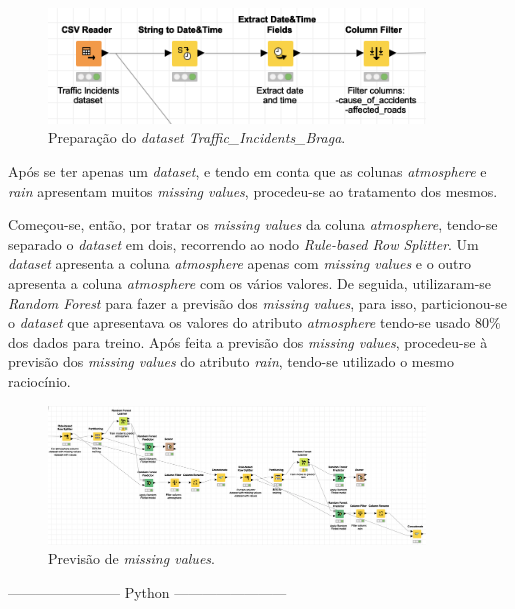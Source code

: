 \documentclass[a4paper, 12pt]{article}
\begin{document}
\begin{figure}[H]
	\centering
	\includegraphics[width=10cm]{incident}
	\caption{Preparação do \textit{dataset Traffic\_Incidents\_Braga}.}
\end{figure}

Após se ter apenas um \textit{dataset}, e tendo em conta que as colunas \textit{atmosphere} e \textit{rain} apresentam muitos \textit{missing values}, procedeu-se ao tratamento dos mesmos.

Começou-se, então, por tratar os \textit{missing values} da coluna \textit{atmosphere}, tendo-se separado o \textit{dataset} em dois, recorrendo ao nodo \textit{Rule-based Row Splitter}. Um \textit{dataset} apresenta a coluna \textit{atmosphere} apenas com \textit{missing values} e o outro apresenta a coluna \textit{atmosphere} com os vários valores. De seguida, utilizaram-se \textit{Random Forest} para fazer a previsão dos \textit{missing values}, para isso, particionou-se o \textit{dataset} que apresentava os valores do atributo \textit{atmosphere} tendo-se usado $80\%$ dos dados para treino. Após feita a previsão dos \textit{missing values}, procedeu-se à previsão dos \textit{missing values} do atributo \textit{rain}, tendo-se utilizado o mesmo raciocínio.

\begin{figure}[H]
	\centering
	\includegraphics[width=10cm]{final}
	\caption{Previsão de \textit{missing values}.}
\end{figure}

\begin{center}
	------------------------ Python ------------------------
\end{center}
\end{document}
